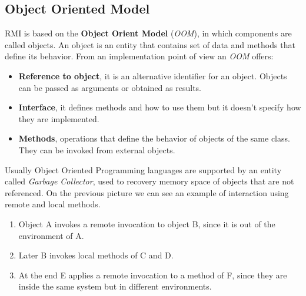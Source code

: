 \documentclass[11pt,a4paper]{article}
\begin{document}
\subsection{Object Oriented Model}
RMI is based on the \textbf{Object Orient Model} (\textit{OOM}), in which components are called objects. An object is an entity that contains set of data and methods that define its behavior. From an implementation point of view an \textit{OOM} offers:
\begin{itemize}
	\item \textbf{Reference to object}, it is an alternative identifier for an object. Objects can be passed as arguments or obtained as results.
	\item \textbf{Interface}, it defines methods and how to use them but it doesn't specify how they are implemented.
	\item \textbf{Methods}, operations that define the behavior of objects of the same class. They can be invoked from external objects. 
\end{itemize}
Usually Object Oriented Programming languages are supported by an entity called \textit{Garbage Collector}, used to recovery memory space of objects that are not referenced.
On the previous picture we can see an example of interaction using remote and local methods. 
\begin{enumerate}
	\item Object A invokes a remote invocation to object B, since it is out of the environment of A.
	\item Later B invokes local methods of C and D.
	\item At the end E applies a remote invocation to a method of F, since they are inside the same system but in different environments.
\end{enumerate}
  
\end{document}
